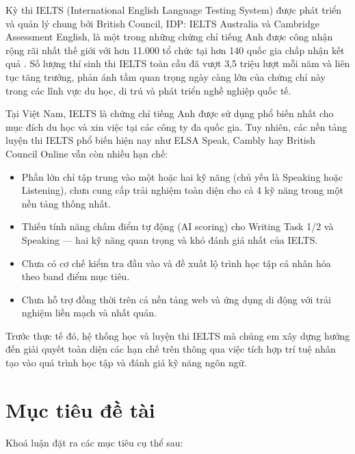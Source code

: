 \documentclass[a4paper,12pt]{extreport}
\begin{document}
Kỳ thi IELTS (International English Language Testing System) được phát triển và quản lý chung bởi British Council, IDP: IELTS Australia và Cambridge Assessment English, là một trong những chứng chỉ tiếng Anh được công nhận rộng rãi nhất thế giới với hơn 11.000 tổ chức tại hơn 140 quốc gia chấp nhận kết quả \cite{ielts-global-stats}. Số lượng thí sinh thi IELTS toàn cầu đã vượt 3,5 triệu lượt mỗi năm và liên tục tăng trưởng, phản ánh tầm quan trọng ngày càng lớn của chứng chỉ này trong các lĩnh vực du học, di trú và phát triển nghề nghiệp quốc tế.

Tại Việt Nam, IELTS là chứng chỉ tiếng Anh được sử dụng phổ biến nhất cho mục đích du học và xin việc tại các công ty đa quốc gia. Tuy nhiên, các nền tảng luyện thi IELTS phổ biến hiện nay như ELSA Speak, Cambly hay British Council Online vẫn còn nhiều hạn chế:

\begin{itemize}
    \item Phần lớn chỉ tập trung vào một hoặc hai kỹ năng (chủ yếu là Speaking hoặc Listening), chưa cung cấp trải nghiệm toàn diện cho cả 4 kỹ năng trong một nền tảng thống nhất.
    \item Thiếu tính năng chấm điểm tự động (AI scoring) cho Writing Task 1/2 và Speaking — hai kỹ năng quan trọng và khó đánh giá nhất của IELTS.
    \item Chưa có cơ chế kiểm tra đầu vào và đề xuất lộ trình học tập cá nhân hóa theo band điểm mục tiêu.
    \item Chưa hỗ trợ đồng thời trên cả nền tảng web và ứng dụng di động với trải nghiệm liền mạch và nhất quán.
\end{itemize}

Trước thực tế đó, hệ thống học và luyện thi IELTS mà chúng em xây dựng hướng đến giải quyết toàn diện các hạn chế trên thông qua việc tích hợp trí tuệ nhân tạo vào quá trình học tập và đánh giá kỹ năng ngôn ngữ.

\section{Mục tiêu đề tài}

Khoá luận đặt ra các mục tiêu cụ thể sau:
\end{document}
